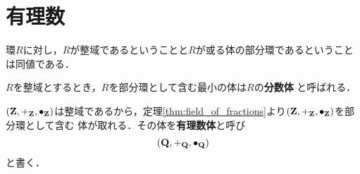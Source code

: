 \section{有理数}
	\begin{screen}
		\begin{thm}[分数体の存在]\label{thm:field_of_fractions}
			環$R$に対し，$R$が整域であるということと$R$が或る体の部分環であるということは同値である．
		\end{thm}
	\end{screen}
	
	$R$を整域とするとき，$R$を部分環として含む最小の体は$R$の{\bf 分数体}
	と呼ばれる．
	
	$(\mathbf{Z},+_{\mathbf{Z}},\bullet_{\mathbf{Z}})$は整域であるから，定理\ref{thm:field_of_fractions}より$(\mathbf{Z},+_{\mathbf{Z}},\bullet_{\mathbf{Z}})$を部分環として含む
	体が取れる．その体を{\bf 有理数体}と呼び
	\begin{align}
		(\mathbf{Q},+_{\mathbf{Q}},\bullet_{\mathbf{Q}})
	\end{align}
	と書く．
